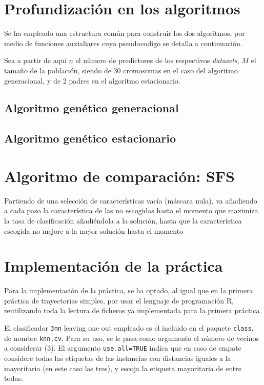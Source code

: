\documentclass[a4paper,11pt]{article}
\begin{document}
\newpage
\section{Profundización en los algoritmos}
Se ha empleado una estructura común para construir los dos algoritmos, por medio de funciones auxialiares cuyo pseudocodigo
se detalla a continuación.

\small{\texttt{}}
\normalsize

Sea a partir de aquí $n$ el número de predictores de los respectivos \textit{datasets}, $M$ el tamaño de la población, 
siendo de 30 cromosomas en el caso del algoritmo generacional, y de 2 padres en el algoritmo estacionario.

\subsection{Algoritmo genético generacional}

\normalsize

\subsection{Algoritmo genético estacionario}

\normalsize

\section{Algoritmo de comparación: SFS}
\small{\texttt{}}

Partiendo de una selección de características vacía (máscara nula), va añadiendo a cada paso la característica
de las no escogidas hasta el momento que maximiza la tasa de clasificación añadiéndola a la solución, hasta
que la característica escogida no mejore a la mejor solución hasta el momento

\section{Implementación de la práctica}
Para la implementación de la práctica, se ha optado, al igual que en la primera práctica de trayectorias simples,
por usar el lenguaje de programación R, reutilizando toda la lectura de ficheros ya implementada para la primera práctica

El clasificador \texttt{3nn} leaving one out empleado es el incluido en el paquete \texttt{class}, de nombre
\texttt{knn.cv}. Para su uso, se le pasa como argumento el número de vecinos a considerar (3). El argumento 
\texttt{use.all=TRUE} indica que en caso de empate considere todas las etiquetas de las instancias con distancias 
iguales a la mayoritaria (en este caso las tres), y escoja la etiqueta mayoritaria de entre todas. 
\end{document}
